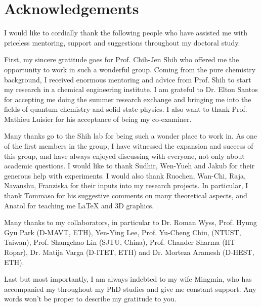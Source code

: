 
\bigskip

\begingroup
\let\clearpage\relax
\let\cleardoublepage\relax
\let\cleardoublepage\relax
\chapter*{Acknowledgements}

\def\thanks#1{%
\begingroup
\leftskip1em
\noindent #1
\par
\endgroup
}

I would like to cordially thank the following people who have assisted
me with priceless mentoring, support and suggestions throughout my doctoral study.

First, my sincere gratitude goes for Prof. Chih-Jen Shih who
offered me the opportunity to work in such a wonderful group. Coming
from the pure chemistry background, I received enormous mentoring and
advice from Prof. Shih to start my research in a chemical engineering
institute. 
%
I am  grateful to Dr. Elton Santos for accepting me doing the summer research exchange and bringing me into the fields of quantum chemistry and solid state physics.
%
I also want to thank Prof. Mathieu Luisier for his acceptance of being
my co-examiner.

Many thanks go to the Shih lab for being such a wonder place to work
in. As one of the first members in the group, I have witnessed the
expansion and success of this group, and have always enjoyed
discussing with everyone, not only about academic questions. I would
like to thank Sudhir, Wen-Yueh and Jakub for their generous help with
experiments. I would also thank Ruochen, Wan-Chi, Raja, Navanshu,
Franziska for their inputs into my research projects. In particular, I
thank Tommaso for his suggestive comments on many theoretical aspects,
and Anatol for teaching me \LaTeX{} and 3D graphics.


Many thanks to my collaborators, in particular to Dr. Roman Wyss,
Prof. Hyung Gyu Park (D-MAVT, ETH), Yen-Ying Lee, Prof. Yu-Cheng Chiu,
(NTUST, Taiwan), Prof. Shangchao Lin (SJTU, China), Prof. Chander
Sharma (IIT Ropar), Dr. Matija Varga (D-ITET, ETH) and Dr. Morteza
Aramesh (D-HEST, ETH).

Last but most importantly, I am always indebted to my wife Mingmin,
who has accompanied my throughout my PhD studies and give me constant
support. Any words won't be proper to describe my gratitude to you.

\endgroup
